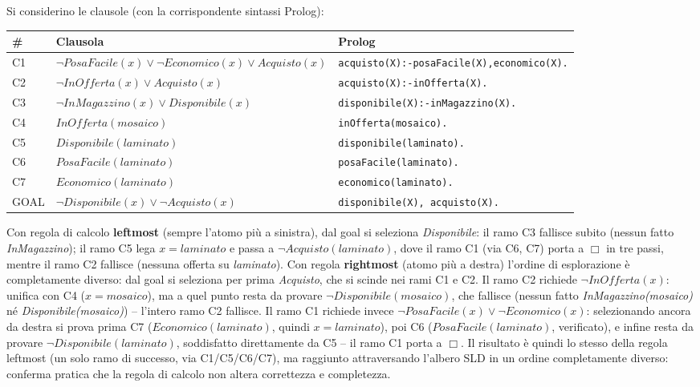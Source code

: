 \documentclass[a4paper,11pt]{article}
\begin{document}
Si considerino le clausole (con la corrispondente sintassi Prolog):
\begin{center}
\small
\begin{tabular}{lll}
\toprule
\# & Clausola & Prolog \\
\midrule
C1 & $\neg PosaFacile(x)\vee\neg Economico(x)\vee Acquisto(x)$ & \texttt{acquisto(X):-posaFacile(X),economico(X).} \\
C2 & $\neg InOfferta(x)\vee Acquisto(x)$ & \texttt{acquisto(X):-inOfferta(X).} \\
C3 & $\neg InMagazzino(x)\vee Disponibile(x)$ & \texttt{disponibile(X):-inMagazzino(X).} \\
C4 & $InOfferta(mosaico)$ & \texttt{inOfferta(mosaico).} \\
C5 & $Disponibile(laminato)$ & \texttt{disponibile(laminato).} \\
C6 & $PosaFacile(laminato)$ & \texttt{posaFacile(laminato).} \\
C7 & $Economico(laminato)$ & \texttt{economico(laminato).} \\
\midrule
GOAL & $\neg Disponibile(x)\vee\neg Acquisto(x)$ & \texttt{disponibile(X), acquisto(X).} \\
\bottomrule
\end{tabular}
\end{center}
Con regola di calcolo \textbf{leftmost} (sempre l'atomo più a sinistra), dal goal si seleziona \emph{Disponibile}: il ramo C3 fallisce subito (nessun fatto \emph{InMagazzino}); il ramo C5 lega $x{=}laminato$ e passa a $\neg Acquisto(laminato)$, dove il ramo C1 (via C6, C7) porta a $\Box$ in tre passi, mentre il ramo C2 fallisce (nessuna offerta su \emph{laminato}). Con regola \textbf{rightmost} (atomo più a destra) l'ordine di esplorazione è completamente diverso: dal goal si seleziona per prima \emph{Acquisto}, che si scinde nei rami C1 e C2. Il ramo C2 richiede $\neg InOfferta(x)$: unifica con C4 ($x{=}mosaico$), ma a quel punto resta da provare $\neg Disponibile(mosaico)$, che fallisce (nessun fatto \emph{InMagazzino(mosaico)} né \emph{Disponibile(mosaico)}) -- l'intero ramo C2 fallisce. Il ramo C1 richiede invece $\neg PosaFacile(x)\vee\neg Economico(x)$: selezionando ancora da destra si prova prima C7 ($Economico(laminato)$, quindi $x{=}laminato$), poi C6 ($PosaFacile(laminato)$, verificato), e infine resta da provare $\neg Disponibile(laminato)$, soddisfatto direttamente da C5 -- il ramo C1 porta a $\Box$. Il risultato è quindi lo stesso della regola leftmost (un solo ramo di successo, via C1/C5/C6/C7), ma raggiunto attraversando l'albero SLD in un ordine completamente diverso: conferma pratica che la regola di calcolo non altera correttezza e completezza.
\end{document}
